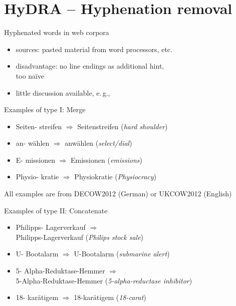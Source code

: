 \section{HyDRA -- Hyphenation removal}

\begin{frame}
  {Hyphenated words in web corpora}
  \begin{itemize}
    \item sources: pasted material from word processors, etc.
    \item disadvantage: no line endings as additional hint,\\
      \cite{GrefenstetteTapanainen1994} too naïve
    \item little discussion available, e.\,g., \cite{Zamorano2011} 
  \end{itemize}
\end{frame}

\begin{frame}
  {Examples of type I: Merge}
  \begin{itemize}
    \item \alert{Seiten- streifen} $\Rightarrow$ Seitenstreifen (\textit{hard shoulder})
    \item \alert{an- wählen} $\Rightarrow$ anwählen (\textit{select\slash dial})
    \item \alert{E- missionen} $\Rightarrow$ Emissionen (\textit{emissions})
    \item \alert{Physio- kratie} $\Rightarrow$ Physiokratie (\textit{Physiocracy})
  \end{itemize}

  \vspace{0.5cm}
  {\tiny All examples are from DECOW2012 (German) or UKCOW2012 (English)}
\end{frame}

\begin{frame}
  {Examples of type II: Concatenate}
  \begin{itemize}
    \item \alert{Philipps- Lagerverkauf} $\Rightarrow$\\
      Philipps-Lagerverkauf (\textit{Philips stock sale})
    \item \alert{U- Bootalarm} $\Rightarrow$ U-Bootalarm (\textit{submarine alert})
    \item \alert{5- Alpha-Reduktase-Hemmer} $\Rightarrow$\\
      5-Alpha-Reduktase-Hemmer (\textit{5-alpha-reductase inhibitor})
    \item \alert{18- karätigem} $\Rightarrow$ 18-karätigem (\textit{18-carat})
  \end{itemize}
\end{frame}

